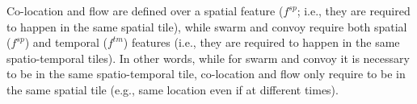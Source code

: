 \documentclass[
]{ceurart}
\begin{document}
Co-location and flow are defined over a spatial feature ($f^{sp}$; i.e., they are required to happen in the same spatial tile), while swarm and convoy require both spatial ($f^{sp}$) and temporal ($f^{tm}$) features (i.e., they are required to happen in the same spatio-temporal tiles).
In other words, while for swarm and convoy it is necessary to be in the same spatio-temporal tile, co-location and flow only require to be in the same spatial tile (e.g., same location even if at different times).
\end{document}
